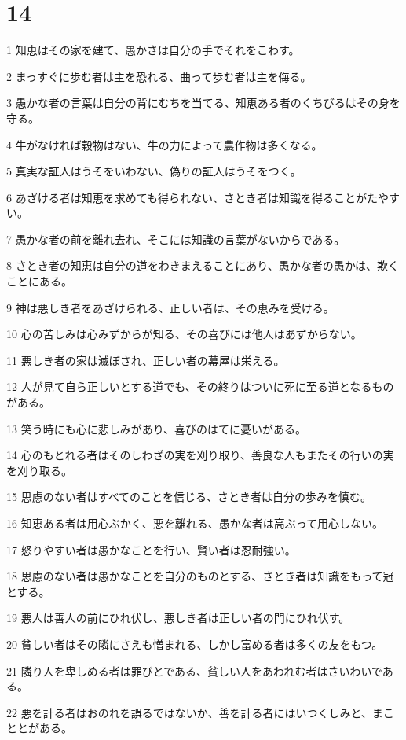 \chapter{14}

\par 1 知恵はその家を建て、愚かさは自分の手でそれをこわす。
\par 2 まっすぐに歩む者は主を恐れる、曲って歩む者は主を侮る。
\par 3 愚かな者の言葉は自分の背にむちを当てる、知恵ある者のくちびるはその身を守る。
\par 4 牛がなければ穀物はない、牛の力によって農作物は多くなる。
\par 5 真実な証人はうそをいわない、偽りの証人はうそをつく。
\par 6 あざける者は知恵を求めても得られない、さとき者は知識を得ることがたやすい。
\par 7 愚かな者の前を離れ去れ、そこには知識の言葉がないからである。
\par 8 さとき者の知恵は自分の道をわきまえることにあり、愚かな者の愚かは、欺くことにある。
\par 9 神は悪しき者をあざけられる、正しい者は、その恵みを受ける。
\par 10 心の苦しみは心みずからが知る、その喜びには他人はあずからない。
\par 11 悪しき者の家は滅ぼされ、正しい者の幕屋は栄える。
\par 12 人が見て自ら正しいとする道でも、その終りはついに死に至る道となるものがある。
\par 13 笑う時にも心に悲しみがあり、喜びのはてに憂いがある。
\par 14 心のもとれる者はそのしわざの実を刈り取り、善良な人もまたその行いの実を刈り取る。
\par 15 思慮のない者はすべてのことを信じる、さとき者は自分の歩みを慎む。
\par 16 知恵ある者は用心ぶかく、悪を離れる、愚かな者は高ぶって用心しない。
\par 17 怒りやすい者は愚かなことを行い、賢い者は忍耐強い。
\par 18 思慮のない者は愚かなことを自分のものとする、さとき者は知識をもって冠とする。
\par 19 悪人は善人の前にひれ伏し、悪しき者は正しい者の門にひれ伏す。
\par 20 貧しい者はその隣にさえも憎まれる、しかし富める者は多くの友をもつ。
\par 21 隣り人を卑しめる者は罪びとである、貧しい人をあわれむ者はさいわいである。
\par 22 悪を計る者はおのれを誤るではないか、善を計る者にはいつくしみと、まこととがある。
